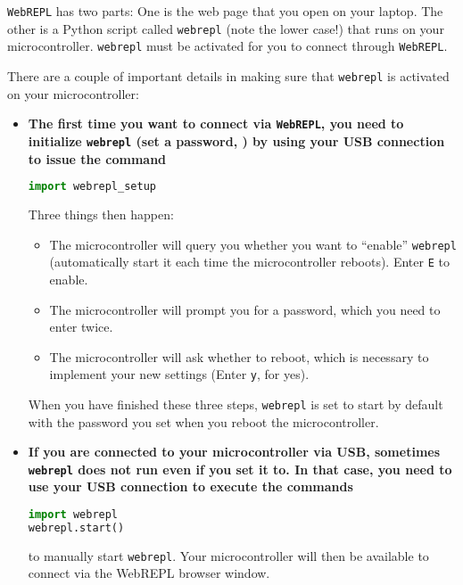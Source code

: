 
\begin{kaobox}[frametitle=Making sure \texttt{webrepl} is active on your microcontroller \dots]
\texttt{WebREPL} has two parts: 
One is the web page that you open on your laptop. 
The other is a Python script called \texttt{webrepl} (note the lower case!) that runs on your microcontroller.
\texttt{webrepl} must be activated for you to connect through \texttt{WebREPL}. 
	
There are a couple of important details in making sure that \texttt{webrepl} is activated on your microcontroller:
\begin{itemize}
\item \textbf{The first time you want to connect via \texttt{WebREPL}, you need to initialize \texttt{webrepl} (set a password, \etc) by using your USB connection to issue the command}
\begin{lstlisting}[language=Python]
import webrepl_setup
\end{lstlisting}
Three things then happen:
\begin{itemize}
	\item The microcontroller will query you whether you want to ``enable'' \texttt{webrepl} (automatically start it each time the microcontroller reboots). Enter \texttt{E} to enable.
	\item The microcontroller will prompt you for a password, which you need to enter twice. 
	\item The microcontroller will ask whether to reboot, which is necessary to implement your new settings (Enter \texttt{y}, for yes).
\end{itemize}
When you have finished these three steps, \texttt{webrepl} is set to start by default with the password you set when you reboot the microcontroller.

\item \textbf{If you are connected to your microcontroller via USB, sometimes \texttt{webrepl} does not run even if you set it to. In that case, you need to use your USB connection to execute the commands}
\begin{lstlisting}[language=Python]
import webrepl
webrepl.start()
\end{lstlisting}
to manually start \texttt{webrepl}. Your microcontroller will then be available to connect via the WebREPL browser window.
\end{itemize}
\end{kaobox}

